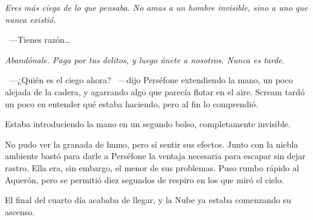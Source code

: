 \emph{Eres más ciega de lo que pensaba. No amas a un hombre invisible, sino a uno que nunca existió.}

~---Tienes razón\dots

\emph{Abandónale. Paga por tus delitos, y luego únete a nosotros. Nunca es tarde.}

~---¿Quién es el ciego ahora? ~---dijo Perséfone extendiendo la mano, un poco alejada de la cadera, y agarrando algo que parecía flotar en el aire. Scream tardó un poco en entender qué estaba haciendo, pero al fin lo comprendió.

Estaba introduciendo la mano en un segundo bolso, completamente invisible.

No pudo ver la granada de humo, pero sí sentir sus efectos. Junto con la niebla ambiente bastó para darle a Perséfone la ventaja necesaria para escapar sin dejar rastro. Ella era, sin embargo, el menor de sus problemas. Puso rumbo rápido al Aquerón, pero se permitió diez segundos de respiro en los que miró el cielo.

El final del cuarto día acababa de llegar, y la Nube ya estaba comenzando su ascenso.
